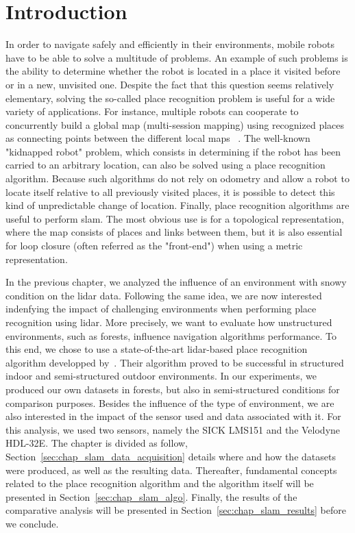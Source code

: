 \section{Introduction}
\label{sec:chap_slam_intro}

In order to navigate safely and efficiently in their environments, mobile robots have to be able to solve a multitude of problems. An example of such problems is the ability to determine whether the robot is located in a place it visited before or in a new, unvisited one.  Despite the fact that this question seems relatively elementary, solving the so-called place recognition problem is useful for a wide variety of applications. For instance, multiple robots can cooperate to concurrently build a global map (multi-session mapping) using recognized places as connecting points between the different local maps ~\citep{Howard2004}. The well-known "kidnapped robot" problem, which consists in determining if the robot has been carried to an arbitrary location, can also be solved using a place recognition algorithm. Because such algorithms do not rely on odometry and allow a robot to locate itself relative to all previously visited places, it is possible to detect this kind of unpredictable change of location. Finally, place recognition algorithms are useful to perform \gls*{slam}. The most obvious use is for a topological representation, where the map consists of places and links between them, but it is also essential for loop closure (often referred as the "front-end") when using a metric representation. 


In the previous chapter, we analyzed the influence of an environment with snowy condition on the \gls*{lidar} data. Following the same idea, we are now interested indenfying the impact of challenging environments when performing place recognition using \gls*{lidar}. More precisely, we want to evaluate how unstructured environments, such as forests, influence navigation algorithms performance. To this end, we chose to use a state-of-the-art \gls*{lidar}-based place recognition algorithm developped by~\citet{Steder2011b}. Their algorithm proved to be successful in structured indoor and semi-structured outdoor environments. In our experiments, we produced our own datasets in forests, but also in semi-structured conditions for comparison purposes. Besides the influence of the type of environment, we are also interested in the impact of the sensor used and data associated with it. For this analysis, we used two sensors, namely the SICK LMS151 and the Velodyne HDL-32E. The chapter is divided as follow, Section~\ref{sec:chap_slam_data_acquisition} details where and how the datasets were produced, as well as the resulting data. Thereafter, fundamental concepts related to the place recognition algorithm and the algorithm itself will be presented in Section~\ref{sec:chap_slam_algo}. Finally, the results of the comparative analysis will be presented in Section~\ref{sec:chap_slam_results} before we conclude.


